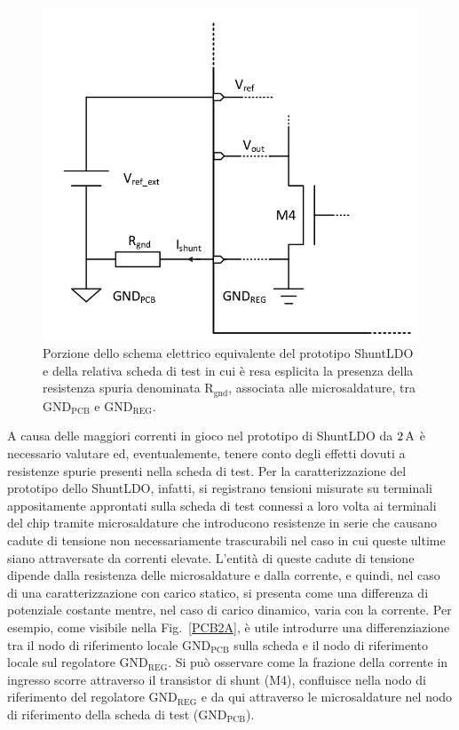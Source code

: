 \begin{figure}[!ht]
\centering
\includegraphics[scale=.3]{Immagini/Ground}
\caption{Porzione dello schema elettrico equivalente del prototipo ShuntLDO e della relativa scheda di test in cui \`e resa esplicita la presenza della resistenza spuria denominata $\mathrm{R_{gnd}}$, associata alle microsaldature, tra $\mathrm{GND_{PCB}}$ e $\mathrm{GND_{REG}}$.}
\label{Ground}
\end{figure}
A causa delle maggiori correnti in gioco nel prototipo di ShuntLDO da $2\rm \, A$ \`e necessario valutare ed, eventualemente, tenere conto degli effetti dovuti a resistenze spurie presenti nella scheda di test. Per la caratterizzazione del prototipo dello ShuntLDO, infatti, si registrano tensioni misurate su terminali appositamente approntati sulla scheda di test connessi a loro volta ai terminali del chip tramite microsaldature che introducono resistenze in serie che causano cadute di tensione non necessariamente trascurabili nel caso in cui queste ultime siano attraversate da correnti elevate. L'entità di queste cadute di tensione dipende dalla resistenza delle microsaldature e dalla corrente, e quindi, nel caso di una caratterizzazione con carico statico, si presenta come una differenza di potenziale costante mentre, nel caso di carico dinamico, varia con la corrente. Per esempio, come visibile nella Fig.~\ref{PCB2A}, \`e utile introdurre una differenziazione tra il nodo di riferimento locale $\mathrm{GND_{PCB}}$ sulla scheda e il nodo di riferimento locale sul regolatore $\mathrm{GND_{REG}}$. Si pu\`o osservare come la frazione della corrente in ingresso scorre attraverso il transistor di shunt (M4), confluisce nella nodo di riferimento del regolatore $\mathrm{GND_{REG}}$ e da qui attraverso le microsaldature nel nodo di riferimento della scheda di test ($\mathrm{GND_{PCB}}$). 
